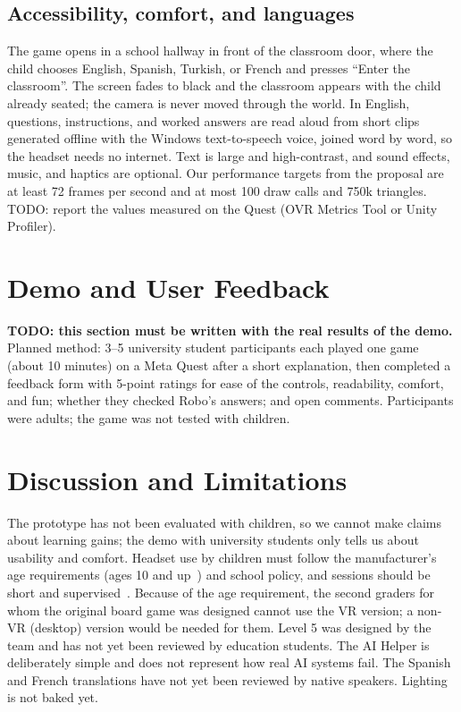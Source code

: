 \documentclass[conference]{IEEEtran}
\begin{document}
\subsection{Accessibility, comfort, and languages}
The game opens in a school hallway in front of the classroom door, where the child chooses English, Spanish, Turkish, or French and presses ``Enter the classroom''. The screen fades to black and the classroom appears with the child already seated; the camera is never moved through the world. In English, questions, instructions, and worked answers are read aloud from short clips generated offline with the Windows text-to-speech voice, joined word by word, so the headset needs no internet. Text is large and high-contrast, and sound effects, music, and haptics are optional. Our performance targets from the proposal are at least 72 frames per second and at most 100 draw calls and 750k triangles. TODO: report the values measured on the Quest (OVR Metrics Tool or Unity Profiler).

\section{Demo and User Feedback}
\textbf{TODO: this section must be written with the real results of the demo.} Planned method: 3--5 university student participants each played one game (about 10 minutes) on a Meta Quest after a short explanation, then completed a feedback form with 5-point ratings for ease of the controls, readability, comfort, and fun; whether they checked Robo's answers; and open comments. Participants were adults; the game was not tested with children.


\section{Discussion and Limitations}
The prototype has not been evaluated with children, so we cannot make claims about learning gains; the demo with university students only tells us about usability and comfort. Headset use by children must follow the manufacturer's age requirements (ages 10 and up~\cite{metaparent}) and school policy, and sessions should be short and supervised~\cite{southgate2019,yu2018}. Because of the age requirement, the second graders for whom the original board game was designed cannot use the VR version; a non-VR (desktop) version would be needed for them. Level 5 was designed by the team and has not yet been reviewed by education students. The AI Helper is deliberately simple and does not represent how real AI systems fail. The Spanish and French translations have not yet been reviewed by native speakers. Lighting is not baked yet.
\end{document}
